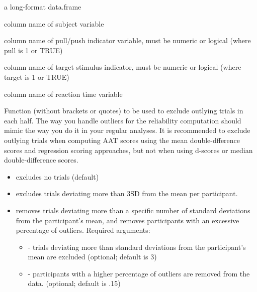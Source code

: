 \documentclass[a4paper]{book}
\begin{document}
%
\begin{Arguments}
\begin{ldescription}
\item[\code{ds}] a long-format data.frame

\item[\code{subjvar}] column name of subject variable

\item[\code{pullvar}] column name of pull/push indicator variable, must be numeric or logical (where pull is 1 or TRUE)

\item[\code{targetvar}] column name of target stimulus indicator, must be numeric or logical (where target is 1 or TRUE)

\item[\code{rtvar}] column name of reaction time variable

\item[\code{trialdropfunc}] Function (without brackets or quotes) to be used to exclude outlying trials in each half.
The way you handle outliers for the reliability computation should mimic the way you do it in your regular analyses.
It is recommended to exclude outlying trials when computing AAT scores using the mean double-dfference scores and regression scoring approaches,
but not when using d-scores or median double-difference scores.
\begin{itemize}

\item{}  excludes no trials (default)
\item{}  excludes trials deviating more than 3SD from the mean per participant.
\item{}  removes trials deviating more than a specific number of standard deviations from the participant's mean,
and removes participants with an excessive percentage of outliers.
Required arguments:
\begin{itemize}

\item{}  - trials deviating more than  standard deviations from the participant's mean are excluded (optional; default is 3)
\item{}  - participants with a higher percentage of outliers are removed from the data. (optional; default is .15)

\end{itemize}


\end{itemize}
\end{ldescription}
\end{Arguments}
\end{document}
